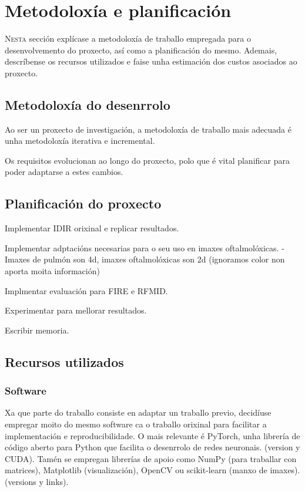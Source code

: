\chapter{Metodoloxía e planificación}
\label{chap:Metodoloxía e planificación}
\lettrine{N}{esta} sección explícase a metodoloxía de traballo empregada para o desenvolvemento do proxecto, así como a planificación do mesmo.
 Ademais, descríbense os recursos utilizados e faise unha estimación dos custos asociados ao proxecto.

\section{Metodoloxía do desenrrolo}
\label{sec:Metodoloxía do desenrrolo}

Ao ser un proxecto de investigación, a metodoloxía de traballo mais adecuada é unha metodoloxía iterativa e incremental.

Os requisitos evolucionan ao longo do proxecto, polo que é vital planificar para poder adaptarse a estes cambios.


\section{Planificación do proxecto}
\label{sec:Planificación do proxecto}

Implementar IDIR orixinal e replicar resultados.

Implementar adptacións necesarias para o seu uso en imaxes oftalmolóxicas.
    - Imaxes de pulmón son 4d, imaxes oftalmolóxicas son 2d (ignoramos color non aporta moita información)

Implmentar evaluación para FIRE e RFMID.

Experimentar para mellorar resultados.

Escribir memoria.

\section{Recursos utilizados}
\label{sec:Recursos utilizados}

\subsection{Software}
\label{subsec:Software}

Xa que parte do traballo consiste en adaptar un traballo previo, 
decidíuse empregar moito do mesmo software ca o traballo orixinal para facilitar a implementación e reproducibilidade.
O mais relevante é PyTorch, unha librería de código aberto para Python que facilita o desenrrolo de redes neuronais.
(version y CUDA). Tamén se empregan librerías de apoio como NumPy (para traballar con matrices), Matplotlib (visualización), OpenCV ou scikit-learn (manxo de imaxes).
(versions y links).

